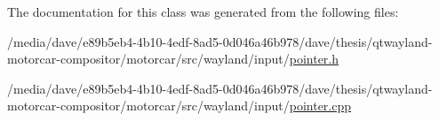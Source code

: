 The documentation for this class was generated from the following files\-:\begin{DoxyCompactItemize}
\item 
/media/dave/e89b5eb4-\/4b10-\/4edf-\/8ad5-\/0d046a46b978/dave/thesis/qtwayland-\/motorcar-\/compositor/motorcar/src/wayland/input/\hyperlink{pointer_8h}{pointer.\-h}\item 
/media/dave/e89b5eb4-\/4b10-\/4edf-\/8ad5-\/0d046a46b978/dave/thesis/qtwayland-\/motorcar-\/compositor/motorcar/src/wayland/input/\hyperlink{pointer_8cpp}{pointer.\-cpp}\end{DoxyCompactItemize}
